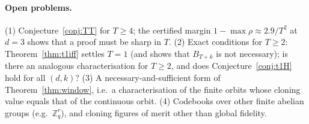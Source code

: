 \documentclass[11pt]{article}
\newcommand{\Z}{\mathbb{Z}}
\theoremstyle{definition}
\theoremstyle{remark}
\begin{document}
\paragraph{Open problems.} (1) Conjecture~\ref{conj:TT} for $T\ge4$; the certified margin $1-\max\rho\approx2.9/T^2$ at $d=3$ shows that a proof
must be sharp in $T$. (2) Exact conditions for $T\ge2$: Theorem~\ref{thm:t1iff} settles $T=1$ (and shows that $B_{T+k}$ is not necessary); is there an analogous
characterisation for $T\ge2$, and does Conjecture~\ref{conj:t1H} hold for all $(d,k)$? (3) A necessary-and-sufficient form of
Theorem~\ref{thm:window}, i.e.\ a characterisation of the finite orbits whose cloning value equals that of the continuous orbit. (4) Codebooks
over other finite abelian groups (e.g.\ $\Z_q^r$), and cloning figures of merit other than global fidelity.
\end{document}
